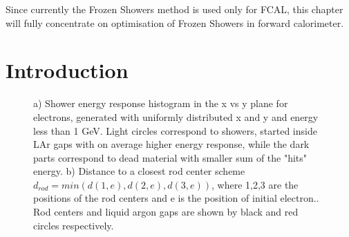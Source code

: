 Since currently the Frozen Showers method is used only for FCAL, this chapter will fully concentrate on optimisation of Frozen Showers in forward calorimeter.



\begin{figure}[!tbp]
\end{figure}



\section{Introduction}\label{sec:FSproblem}





\begin{figure}[!tbp]
\begin{minipage}[h]{0.49\linewidth}
\end{minipage}
\hfill
\begin{minipage}[h]{0.49\linewidth}
\end{minipage}
\caption{ a) Shower energy response histogram in the x vs y plane for electrons, generated with uniformly distributed x and y and energy less than 1 GeV. Light circles correspond to showers, started inside LAr gaps with on average higher energy response, while the dark parts correspond to dead material with smaller sum of the "hits" energy.
b) Distance to a closest rod center scheme $d_{rod} = min( d(1,e), d(2, e), d(3, e))$, where 1,2,3 are the positions of the rod centers and e is the position of initial electron.. Rod centers and liquid argon gaps are shown by black and red circles respectively.}
\label{fig:FSFluctuations}
\end{figure}


